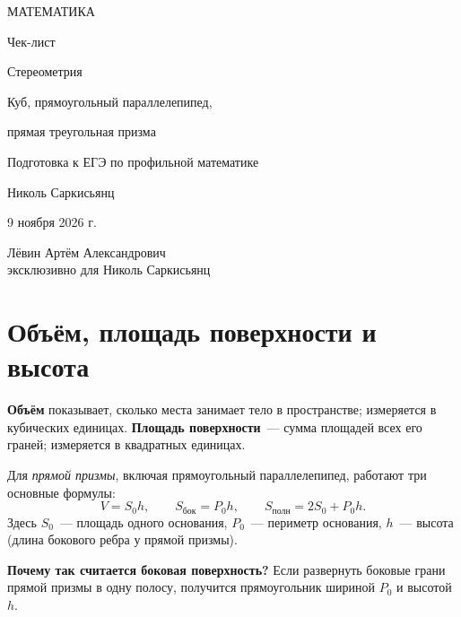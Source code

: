 \documentclass[a4paper,11pt]{article}
\newcommand{\key}[1]{{\color{darkaccent}\bfseries #1}}
\newcommand{\sect}[1]{\section{#1}\vspace{-4pt}}
\begin{document}
\thispagestyle{empty}
\begin{center}
\vspace*{9mm}
{\color{darkaccent}\Large МАТЕМАТИКА}\par
\vspace{28mm}
{\huge Чек-лист}\par
\vspace{14mm}
{\LARGE\color{accent} Стереометрия}\par
\vspace{5mm}
{\large\color{darkaccent} Куб, прямоугольный параллелепипед,}\par
{\large\color{darkaccent} прямая треугольная призма}\par
\vspace{20mm}
{\large Подготовка к ЕГЭ по профильной математике}\par
\vfill
{\large Николь Саркисьянц}\par
\vspace{13mm}
{\large 9 ноября 2026 г.}\par
\vspace{20mm}
{Лёвин Артём Александрович}\\[2pt]
{эксклюзивно для Николь Саркисьянц}\par
\vspace{19mm}
\vspace{2mm}
\end{center}
\clearpage

\sect{Объём, площадь поверхности и высота}

\key{Объём} показывает, сколько места занимает тело в пространстве; измеряется в кубических единицах. \key{Площадь поверхности}~--- сумма площадей всех его граней; измеряется в квадратных единицах.

Для \emph{прямой призмы}, включая прямоугольный параллелепипед, работают три основные формулы:
\[
\boxed{V=S_0h},\qquad
\boxed{S_{\text{бок}}=P_0h},\qquad
\boxed{S_{\text{полн}}=2S_0+P_0h}.
\]
Здесь $S_0$~--- площадь одного основания, $P_0$~--- периметр основания, $h$~--- высота (длина бокового ребра у прямой призмы).

\key{Почему так считается боковая поверхность?} Если развернуть боковые грани прямой призмы в одну полосу, получится прямоугольник шириной $P_0$ и высотой $h$.
\end{document}
